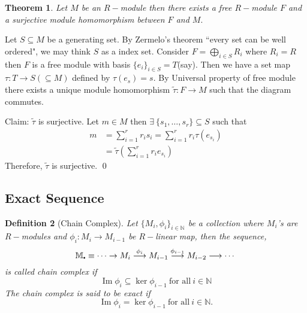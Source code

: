 \documentclass[11pt]{amsart}
\newtheorem{theorem}{Theorem}[section]
\newtheorem{defn}[theorem]{Definition}
\newcommand{\NN}{\mathbb N}
\newcommand\sbullet[1][.5]{\mathbin{\vcenter{\hbox{\scalebox{#1}{$\bullet$}}}}}
\begin{document}
\begin{theorem}
Let $M$ be an $R-$module then there exists a free $R-$module $F$ and a surjective module homomorphism between $F$ and $M.$
\end{theorem}
\proof Let $S\subseteq M$ be a generating set. By Zermelo's theorem ``every set can be well ordered", we may think $S$ as a index set. Consider $F=\displaystyle\bigoplus_{i\in S}R_i$ where $R_i=R$ then $F$ is a free module with basis $\{e_i\}_{i\in S}=T$(say). Then we have a set map $\tau:T\to S(\subseteq M)$ defined by $\tau(e_s)=s.$ By Universal property of free module there exists a unique module homomorphism $\tilde{\tau}:F\to M$ such that the diagram commutes.
\begin{center}
\end{center}
Claim: $\tilde{\tau}$ is surjective. Let $m\in M$ then $\exists~\{s_1,\dots ,s_r\}\subseteq S$ such that \begin{align*}
m&=\displaystyle\sum_{i=1}^r r_is_i=\displaystyle\sum_{i=1}^r r_i\tau(e_{s_i})\\
&=\tilde{\tau}\left(\displaystyle\sum_{i=1}^r r_ie_{s_i}\right)
\end{align*}
Therefore, $\tilde{\tau}$ is surjective. \qed
\subsection{Exact Sequence}

\begin{defn}[Chain Complex]

Let $\{M_i,\phi_i\}_{i\in {\NN}}$ be a collection where $M_i$'s are $R-$modules and $\phi_i:M_i\to M_{i-1}$ be $R-$linear map, then the sequence,
 $$\mathbb{M}_{\sbullet}\equiv \cdots\to M_i\stackrel{\phi_i}{\longrightarrow} M_{i-1}\stackrel{\phi_{i-1}}{\longrightarrow} M_{i-2}\longrightarrow \cdots $$
  is called chain complex if $$\operatorname{Im}\phi_i\subseteq \operatorname{ker}\phi_{i-1}~\text{for all}~ i\in {\NN}$$ The chain complex is said to be exact if $$\operatorname{Im}\phi_i= \operatorname{ker}\phi_{i-1}~\text{for all}~ i\in {\NN}.$$

\end{defn}
\end{document}
